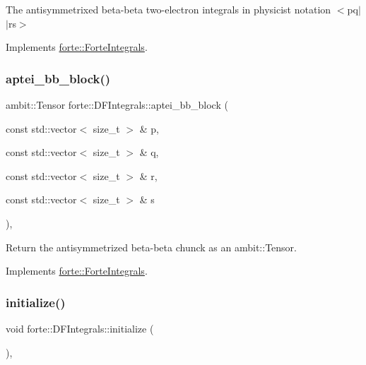 The antisymmetrixed beta-\/beta two-\/electron integrals in physicist notation $<$pq$\vert$$\vert$rs$>$ 



Implements \mbox{\hyperlink{classforte_1_1_forte_integrals_a246225031c3799dc446f94e0e732c3ac}{forte\+::\+Forte\+Integrals}}.

\mbox{\label{classforte_1_1_d_f_integrals_a1eb5b7a379b668d0b10a0871a934b2cd}} 
\subsubsection{\texorpdfstring{aptei\+\_\+bb\+\_\+block()}{aptei\_bb\_block()}}
{\footnotesize\ttfamily ambit\+::\+Tensor forte\+::\+D\+F\+Integrals\+::aptei\+\_\+bb\+\_\+block (\begin{DoxyParamCaption}\item[{const std\+::vector$<$ size\+\_\+t $>$ \&}]{p,  }\item[{const std\+::vector$<$ size\+\_\+t $>$ \&}]{q,  }\item[{const std\+::vector$<$ size\+\_\+t $>$ \&}]{r,  }\item[{const std\+::vector$<$ size\+\_\+t $>$ \&}]{s }\end{DoxyParamCaption})\hspace{0.3cm}{\ttfamily [override]}, {\ttfamily [virtual]}}



Return the antisymmetrized beta-\/beta chunck as an ambit\+::\+Tensor. 



Implements \mbox{\hyperlink{classforte_1_1_forte_integrals_ae2799dc7cbfd456603a2b841b26582ab}{forte\+::\+Forte\+Integrals}}.

\mbox{\label{classforte_1_1_d_f_integrals_a8488339b2eff7dea6e98e29e9bf55a97}} 
\subsubsection{\texorpdfstring{initialize()}{initialize()}}
{\footnotesize\ttfamily void forte\+::\+D\+F\+Integrals\+::initialize (\begin{DoxyParamCaption}{ }\end{DoxyParamCaption})\hspace{0.3cm}{\ttfamily [override]}, {\ttfamily [virtual]}}



